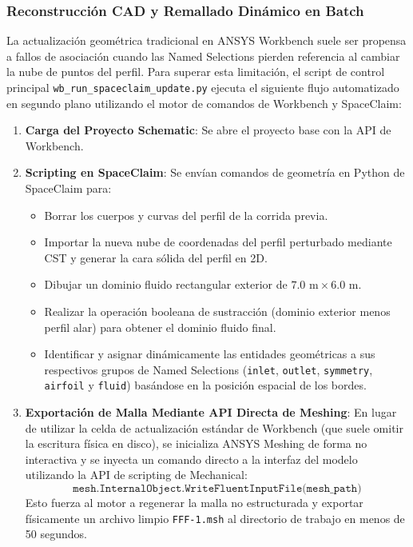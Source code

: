 \begin{enumerate}
\subsubsection{Reconstrucción CAD y Remallado Dinámico en Batch}
La actualización geométrica tradicional en ANSYS Workbench suele ser propensa a fallos de asociación cuando las Named Selections pierden referencia al cambiar la nube de puntos del perfil. Para superar esta limitación, el script de control principal \texttt{wb\_run\_spaceclaim\_update.py} ejecuta el siguiente flujo automatizado en segundo plano utilizando el motor de comandos de Workbench y SpaceClaim:
\begin{enumerate}
    \item \textbf{Carga del Proyecto Schematic}: Se abre el proyecto base con la API de Workbench.
    \item \textbf{Scripting en SpaceClaim}: Se envían comandos de geometría en Python de SpaceClaim para:
        \begin{itemize}
            \item Borrar los cuerpos y curvas del perfil de la corrida previa.
            \item Importar la nueva nube de coordenadas del perfil perturbado mediante CST y generar la cara sólida del perfil en 2D.
            \item Dibujar un dominio fluido rectangular exterior de $7.0\text{ m} \times 6.0\text{ m}$.
            \item Realizar la operación booleana de sustracción (dominio exterior menos perfil alar) para obtener el dominio fluido final.
            \item Identificar y asignar dinámicamente las entidades geométricas a sus respectivos grupos de Named Selections (\texttt{inlet}, \texttt{outlet}, \texttt{symmetry}, \texttt{airfoil} y \texttt{fluid}) basándose en la posición espacial de los bordes.
        \end{itemize}
    \item \textbf{Exportación de Malla Mediante API Directa de Meshing}: En lugar de utilizar la celda de actualización estándar de Workbench (que suele omitir la escritura física en disco), se inicializa ANSYS Meshing de forma no interactiva y se inyecta un comando directo a la interfaz del modelo utilizando la API de scripting de Mechanical:
        \begin{equation}
            \texttt{mesh.InternalObject.WriteFluentInputFile(mesh\_path)}
        \end{equation}
        Esto fuerza al motor a regenerar la malla no estructurada y exportar físicamente un archivo limpio \texttt{FFF-1.msh} al directorio de trabajo en menos de 50 segundos.
\end{enumerate}


\end{enumerate}
